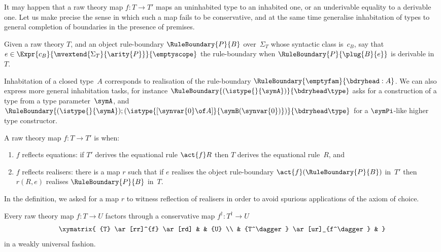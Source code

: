 It may happen that a raw theory map $f : T \to T'$ maps an uninhabited type to an inhabited one, or an underivable equality to a derivable one.
%
Let us make precise the sense in which such a map fails to be conservative,
%
and at the same time generalise inhabitation of types to general completion of boundaries in the presence of premises.

\begin{definition}
  Given a raw theory $T$,
  and an object rule-boundary $\RuleBoundary{P}{B}$ over~$\Sigma_T$ whose syntactic class is~$c_B$, say that $e \in \Expr{c_B}{\mvextend{\Sigma_T}{\arity{P}}}{\emptyscope}$  the rule-boundary when $\RuleBoundary{P}{\plug{B}{e}}$ is derivable in~$T$.
\end{definition}

\begin{example}
  Inhabitation of a closed type~$A$ corresponds to realisation of the rule-boundary
  $\RuleBoundary{\emptyfam}{\bdryhead : A}$.
  We can also express more general inhabitation tasks, for instance
  $\RuleBoundary{(\istype{}{\symA})}{\bdryhead \type}$ asks for a construction of a type from a type parameter~$\symA$, and $\RuleBoundary{(\istype{}{\symA}); (\istype{[\synvar{0} \of A]}{\symB(\synvar{0})})}{\bdryhead \type}$ for a $\symPi$-like higher type constructor.
\end{example}


\begin{definition}
  A raw theory map $f : T \to T'$ is  when:
  \begin{enumerate}
  \item $f$ reflects equations: if $T'$ derives the equational rule $\act{f} R$ then $T$ derives the equational rule~$R$, and

  \item $f$ reflects realisers: there is a map $r$ such that if $e$ realises the object rule-boundary $\act{f} (\RuleBoundary{P}{B})$ in~$T'$ then $r(R, e)$ realises $\RuleBoundary{P}{B}$ in~$T$.
  \end{enumerate}
\end{definition}

In the definition, we asked for a map $r$ to witness reflection of realisers in order to avoid spurious applications of the axiom of choice.

\begin{lemma}
  \label{lem:map-factor-conservative}
  Every raw theory map $f : T \to U$ factors through a
  conservative map $f^\dagger : T^\dagger \to U$
  \begin{equation*}
    \xymatrix{
      {T} \ar[rr]^{f} \ar[rd] & & {U} \\
      & {T^\dagger} \ar[ur]_{f^\dagger} &
    }
  \end{equation*}
  in a weakly universal fashion.
\end{lemma}


